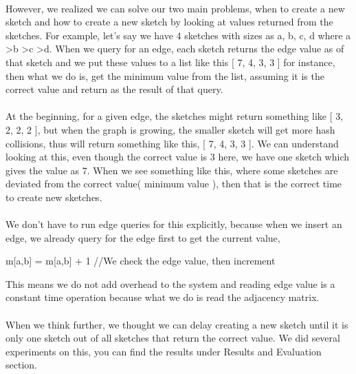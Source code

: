 \documentclass[12pt]{report}
\numberwithin{figure}{section}
\numberwithin{table}{section}
\begin{document}
\paragraph{}

However, we realized we can solve our two main problems, when to create a new sketch and how to create a new sketch by looking at values returned from the sketches. For example, let's say we have 4 sketches with sizes as a, b, c, d where a \textgreater  b \textgreater c \textgreater d. When we query for an edge, each sketch returns the edge value as of that sketch and  we put these values to a list like this [ 7, 4, 3, 3 ] for instance, then what we do is, get the minimum value from the list, assuming it is the correct value and return as the result of that query.

\paragraph{}

At the beginning, for a given edge, the sketches might return something like [ 3, 2, 2, 2 ], but when the graph is growing, the smaller sketch will get more hash collisions, thus will return something like this, [ 7, 4, 3, 3  ]. We can understand looking at this, even though the correct value is 3 here, we have one sketch which gives the value as 7. When we see something like this, where some sketches are deviated from the correct value( minimum value ), then that is the correct time to create new sketches. 

\paragraph{}

We don't have to run edge queries for this explicitly, because when we insert an edge, we already query for the edge first to get the current value, 

   m[a,b] = m[a,b] + 1 //We check the edge value, then increment

This means we do not add overhead to the system and reading edge value is a constant time operation because what we do is read the adjacency matrix. 

\paragraph{}

When we think further, we thought we can delay creating a new sketch until it is only one sketch out of all sketches that return the correct value. We did several experiments on this, you can find the results under Results and Evaluation section.
\end{document}
